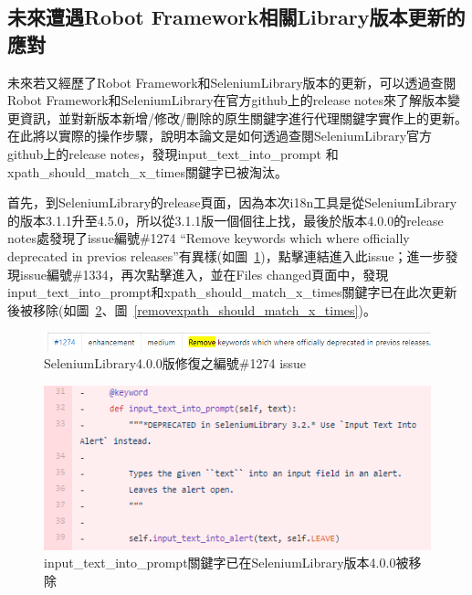 \hspace*{\fill} \\
\\ \hspace*{\fill} \\
\\ \hspace*{\fill} \\

\subsection{未來遭遇Robot Framework相關Library版本更新的應對}

未來若又經歷了Robot Framework和SeleniumLibrary版本的更新，可以透過查閱Robot Framework和SeleniumLibrary在官方github上\cite{robotframeworkgithub}\cite{seleniumlibrarygithub}的release notes來了解版本變更資訊，並對新版本新增/修改/刪除的原生關鍵字進行代理關鍵字實作上的更新。在此將以實際的操作步驟，說明本論文是如何透過查閱SeleniumLibrary官方github上的release notes，發現input\_text\_into\_prompt 和 xpath\_should\_match\_x\_times關鍵字已被淘汰。

首先，到SeleniumLibrary的release頁面，因為本次i18n工具是從SeleniumLibrary的版本3.1.1升至4.5.0，所以從3.1.1版一個個往上找，最後於版本4.0.0的release notes處發現了issue編號\#1274 “Remove keywords which where officially deprecated in previos releases”有異樣(如圖~\ref{seleniumlibrary4.0.0issue})，點擊連結進入此issue；進一步發現issue編號\#1334，再次點擊進入，並在Files changed頁面中，發現input\_text\_into\_prompt和xpath\_should\_match\_x\_times關鍵字已在此次更新後被移除(如圖~\ref{removeinput_text_into_prompt}、圖~\ref{removexpath_should_match_x_times})。
\hspace*{\fill} \\

\begin{figure}[H]
    \includegraphics[width= \textwidth]{../論文截圖/seleniumlibrary4.0.0issue.png}
    \caption{SeleniumLibrary4.0.0版修復之編號\#1274 issue}
    \label{seleniumlibrary4.0.0issue}
\end{figure}

\begin{figure}[H]
    \centering
    \includegraphics[width= .9\textwidth]{../論文截圖/remove input_text_into_prompt.png}
    \caption{input\_text\_into\_prompt關鍵字已在SeleniumLibrary版本4.0.0被移除}
    \label{removeinput_text_into_prompt}
\end{figure}

